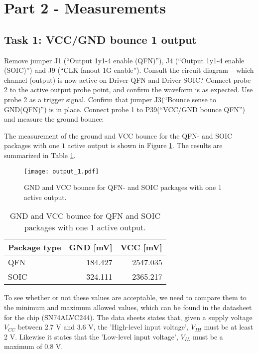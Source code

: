\documentclass[../main.tex]{subfiles}
\begin{document}
\section{Part 2 - Measurements}

\subsection{Task 1: VCC/GND bounce 1 output}

Remove jumper J1 (“Output 1y1-4 enable (QFN)”), J4 (“Output 1y1-4 enable (SOIC)”) and J9 (“CLK fanout 1G enable”).
\vspace{10pt}
Consult the circuit diagram – which channel (output) is now active on Driver QFN and Driver SOIC? Connect probe 2 to the active output probe point, and confirm the waveform is as expected. Use probe 2 as a trigger signal.
\vspace{10pt}
Confirm that jumper J3(“Bounce sense to GND(QFN)”) is in place. Connect probe 1 to P39(“VCC/GND bounce QFN”) and measure the ground bounce:

\solution

The measurement of the ground and VCC bounce for the QFN- and SOIC packages with one \(\textit{1}\) active output is shown in Figure \ref{fig:gnd_vcc_output_1}. The results are summarized in Table \ref{tab:output_1}.

\begin{figure}[H]
    \centering
    \texttt{[image: output\_1.pdf]}
    \caption{GND and VCC bounce for QFN- and SOIC packages with one \(\textit{1}\) active output.}
    \label{fig:gnd_vcc_output_1}
\end{figure}

\begin{table}[H]
    \centering
    \begin{tabular}{l | r r}
        \toprule[1pt]
        Package type    & GND [mV]  & VCC [mV]\\
        \midrule
        QFN             & 184.427   & 2547.035  \\
        SOIC            & 324.111   & 2365.217  \\
        \bottomrule[1pt]
    \end{tabular}
    \caption{GND and VCC bounce for QFN and SOIC packages with one \(\textit{1}\) active output.}
    \label{tab:output_1}
\end{table}

To see whether or not these values are acceptable, we need to compare them to the minimum and maximum allowed values, which can be found in the datasheet for the chip (SN74ALVC244). The data sheets states that, given a supply voltage $V_{CC}$ between 2.7 V and 3.6 V, the 'High-level input voltage', $V_{IH}$ must be at least 2 V. Likewise it states that the 'Low-level input voltage', $V_{IL}$ must be a maximum of 0.8 V. 
\end{document}

